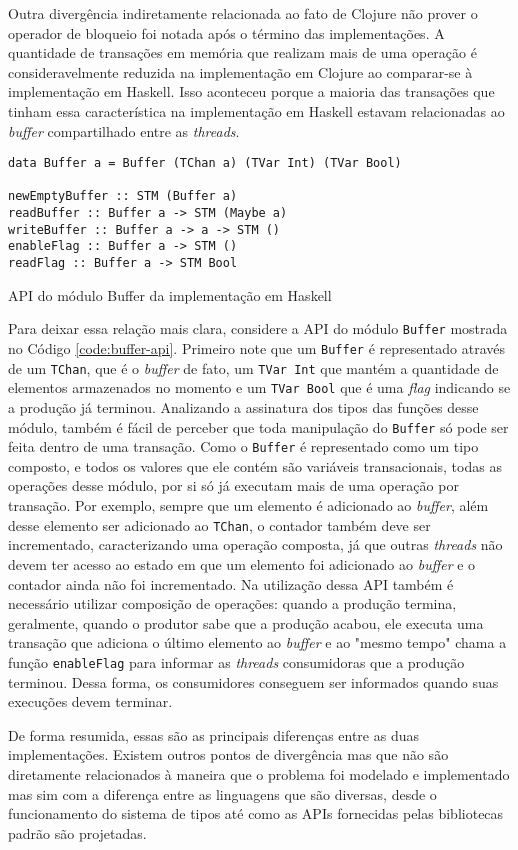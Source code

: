 Outra divergência indiretamente relacionada ao fato de Clojure não prover o operador de bloqueio foi notada após o término das implementações. A quantidade de transações em memória que realizam mais de uma operação é consideravelmente reduzida na implementação em Clojure ao comparar-se à implementação em Haskell. Isso aconteceu porque a maioria das transações que tinham essa característica na implementação em Haskell estavam relacionadas ao \emph{buffer} compartilhado entre as \emph{threads}. 

\begin{listing}[h]
  \begin{verbatim}
data Buffer a = Buffer (TChan a) (TVar Int) (TVar Bool)

newEmptyBuffer :: STM (Buffer a)
readBuffer :: Buffer a -> STM (Maybe a)
writeBuffer :: Buffer a -> a -> STM ()
enableFlag :: Buffer a -> STM ()
readFlag :: Buffer a -> STM Bool
  \end{verbatim}
  \caption{API do módulo Buffer da implementação em Haskell}
  \label{code:buffer-api}
\end{listing}

Para deixar essa relação mais clara, considere a API do módulo \verb|Buffer| mostrada no Código \ref{code:buffer-api}. Primeiro note que um \verb|Buffer| é representado através de um \verb|TChan|, que é o \emph{buffer} de fato, um \verb|TVar Int| que mantém a quantidade de elementos armazenados no momento e um \verb|TVar Bool| que é uma \emph{flag} indicando se a produção já terminou. Analizando a assinatura dos tipos das funções desse módulo, também é fácil de perceber que toda manipulação do \verb|Buffer| só pode ser feita dentro de uma transação. Como o \verb|Buffer| é representado como um tipo composto, e todos os valores que ele contém são variáveis transacionais, todas as operações desse módulo, por si só já executam mais de uma operação por transação. Por exemplo, sempre que um elemento é adicionado ao \emph{buffer}, além desse elemento ser adicionado ao \verb|TChan|, o contador também deve ser incrementado, caracterizando uma operação composta, já que outras \emph{threads} não devem ter acesso ao estado em que um elemento foi adicionado ao \emph{buffer} e o contador ainda não foi incrementado. Na utilização dessa API também é necessário utilizar composição de operações: quando a produção termina, geralmente, quando o produtor sabe que a produção acabou, ele executa uma transação que adiciona o último elemento ao \emph{buffer} e ao "mesmo tempo" chama a função \verb|enableFlag| para informar as \emph{threads} consumidoras que a produção terminou. Dessa forma, os consumidores conseguem ser informados quando suas execuções devem terminar.

De forma resumida, essas são as principais diferenças entre as duas implementações. Existem outros pontos de divergência mas que não são diretamente relacionados à maneira que o problema foi modelado e implementado mas sim com a diferença entre as linguagens que são diversas, desde o funcionamento do sistema de tipos até como as APIs fornecidas pelas bibliotecas padrão são projetadas.
